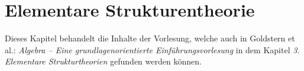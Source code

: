 \chapter{Elementare Strukturentheorie}

Dieses Kapitel behandelt die Inhalte der Vorlesung, welche auch in Goldstern et al.: \textit{Algebra -- Eine grundlagenorientierte Einführungsvorlesung} in dem Kapitel \textit{3. Elementare Strukturtheorien} gefunden werden können.



